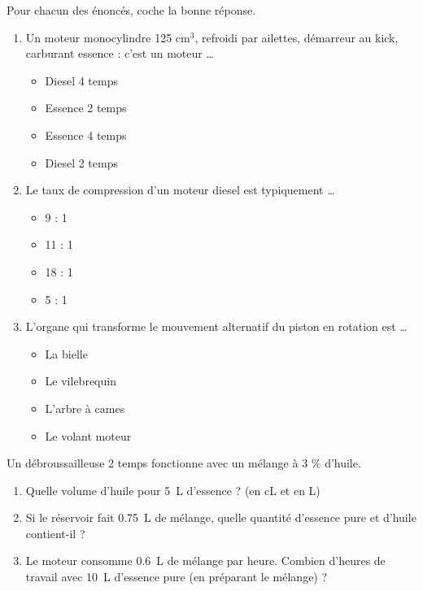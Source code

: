 \documentclass[11pt]{article}
\begin{document}
\begin{exercice}
Pour chacun des énoncés, coche la bonne réponse.
\begin{enumerate}
\item Un moteur monocylindre 125 cm$^3$, refroidi par ailettes, démarreur au kick, carburant essence : c'est un moteur \ldots
\begin{itemize}
\item[A.] Diesel 4 temps \item[B.] Essence 2 temps \item[C.] Essence 4 temps \item[D.] Diesel 2 temps
\end{itemize}
\item Le taux de compression d'un moteur diesel est typiquement \ldots
\begin{itemize}
\item[A.] 9 : 1 \item[B.] 11 : 1 \item[C.] 18 : 1 \item[D.] 5 : 1
\end{itemize}
\item L'organe qui transforme le mouvement alternatif du piston en rotation est \ldots
\begin{itemize}
\item[A.] La bielle \item[B.] Le vilebrequin \item[C.] L'arbre à cames \item[D.] Le volant moteur
\end{itemize}
\end{enumerate}
\end{exercice}

\begin{exercice}
Un débroussailleuse 2 temps fonctionne avec un mélange à 3 \% d'huile.
\begin{enumerate}
\item Quelle volume d'huile pour \SI{5}{L} d'essence ? (en cL et en L)
\item Si le réservoir fait \SI{0,75}{L} de mélange, quelle quantité d'essence pure et d'huile contient-il ?
\item Le moteur consomme \SI{0,6}{L} de mélange par heure. Combien d'heures de travail avec \SI{10}{L} d'essence pure (en préparant le mélange) ?
\end{enumerate}
\end{exercice}
\end{document}

